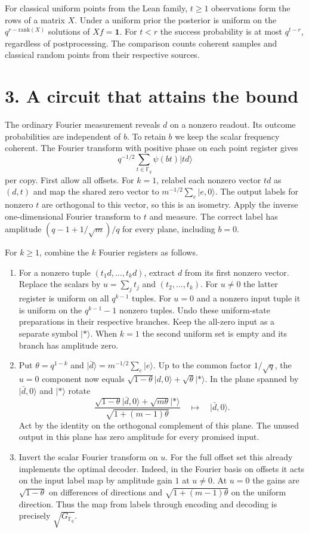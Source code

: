 \documentclass[11pt]{article}
\newcommand{\F}{\mathbb F_q}
\newcommand{\ket}[1]{\lvert #1\rangle}
\newcommand{\one}{\mathbf 1}
\begin{document}
For classical uniform points from the Lean family, $t\ge1$ observations
form the rows of a matrix $X$. Under a uniform prior the posterior is
uniform on the $q^{r-\mathrm{rank}(X)}$ solutions of $Xf=\one$.
For $t<r$ the success probability is at most $q^{t-r}$, regardless of
postprocessing. The comparison counts coherent samples and classical
random points from their respective sources.

\newpage
\section*{3. A circuit that attains the bound}
The ordinary Fourier measurement reveals $d$ on a nonzero readout.
Its outcome probabilities are independent of $b$. To retain $b$ we keep
the scalar frequency coherent. The Fourier transform with positive phase
on each point register gives
\[
  q^{-1/2}\sum_{t\in\F}\psi(bt)\ket{td}
\]
per copy. First allow all offsets. For $k=1$, relabel each nonzero vector
$td$ as $(d,t)$ and map the shared zero vector to
$m^{-1/2}\sum_e\ket{e,0}$. The output labels for nonzero $t$ are
orthogonal to this vector, so this is an isometry. Apply the inverse
one-dimensional Fourier transform to $t$ and measure. The correct label
has amplitude $(q-1+1/\sqrt m)/q$ for every plane, including $b=0$.

For $k\ge1$, combine the $k$ Fourier registers as follows.
\begin{enumerate}
\item For a nonzero tuple $(t_1d,\ldots,t_kd)$, extract $d$ from its first
nonzero vector. Replace the scalars by $u=\sum_j t_j$ and
$(t_2,\ldots,t_k)$. For $u\ne0$ the latter register is uniform on all
$q^{k-1}$ tuples. For $u=0$ and a nonzero input tuple it is uniform on the
$q^{k-1}-1$ nonzero tuples. Undo these uniform-state preparations in
their respective branches. Keep the all-zero input as a separate symbol
$\ket{*}$. When $k=1$ the second uniform set is empty and its branch
has amplitude zero.
\item Put $\theta=q^{1-k}$ and $\ket{\bar d}=m^{-1/2}\sum_e\ket e$.
Up to the common factor $1/\sqrt q$, the $u=0$ component now equals
$\sqrt{1-\theta}\ket{d,0}+\sqrt{\theta}\ket{*}$. In the plane
spanned by $\ket{\bar d,0}$ and $\ket{*}$ rotate
\[
  \frac{\sqrt{1-\theta}\ket{\bar d,0}+\sqrt{m\theta}\ket{*}}
       {\sqrt{1+(m-1)\theta}}
   \quad\longmapsto\quad \ket{\bar d,0}.
\]
Act by the identity on the orthogonal complement of this plane. The unused
output in this plane has zero amplitude for every promised input.
\item Invert the scalar Fourier transform on $u$. For the full offset set
this already implements the optimal decoder. Indeed, in the Fourier basis
on offsets it acts on the input label map by amplitude gain $1$ at $u\ne0$.
At $u=0$ the gains are $\sqrt{1-\theta}$ on differences of directions and
$\sqrt{1+(m-1)\theta}$ on the uniform direction. Thus the map from
labels through encoding and decoding is precisely $\sqrt{G_{\F}}$.
\end{enumerate}
\end{document}
